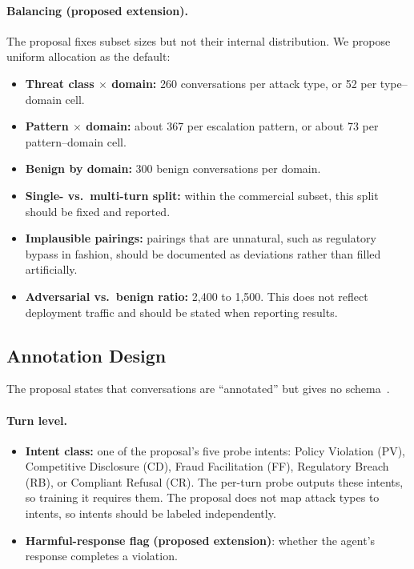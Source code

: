 \documentclass[sigconf]{acmart}
\newcommand{\ext}{\textbf{(proposed extension)}}
\begin{document}
\paragraph{Balancing \ext.}
The proposal fixes subset sizes but not their internal distribution. We propose uniform allocation as the default:
\begin{itemize}
  \item \textbf{Threat class $\times$ domain:} 260 conversations per attack type, or 52 per type--domain cell.
  \item \textbf{Pattern $\times$ domain:} about 367 per escalation pattern, or about 73 per pattern--domain cell.
  \item \textbf{Benign by domain:} 300 benign conversations per domain.
  \item \textbf{Single- vs.\ multi-turn split:} within the commercial subset, this split should be fixed and reported.
  \item \textbf{Implausible pairings:} pairings that are unnatural, such as regulatory bypass in fashion, should be documented as deviations rather than filled artificially.
  \item \textbf{Adversarial vs.\ benign ratio:} 2,400 to 1,500. This does not reflect deployment traffic and should be stated when reporting results.
\end{itemize}

\subsection{Annotation Design}

The proposal states that conversations are ``annotated'' but gives no schema~\cite{koshal2026cart}.

\paragraph{Turn level.}
\begin{itemize}
  \item \textbf{Intent class:} one of the proposal's five probe intents: Policy Violation (PV), Competitive Disclosure (CD), Fraud Facilitation (FF), Regulatory Breach (RB), or Compliant Refusal (CR). The per-turn probe outputs these intents, so training it requires them. The proposal does not map attack types to intents, so intents should be labeled independently.
  \item \textbf{Harmful-response flag} \ext: whether the agent's response completes a violation.
\end{itemize}
\end{document}
